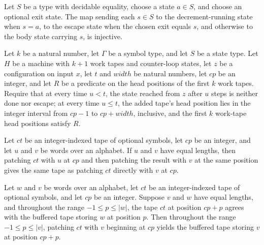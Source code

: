 \begin{lemma}
\label{Turing.counter_redirect_injective}
\leanok
{}
Let $S$ be a type with decidable equality, choose a state $a \in S$, and choose an
optional exit state. The map sending each $s \in S$ to the decrement-running state when
$s=a$, to the escape state when the chosen exit equals $s$, and otherwise to the body
state carrying $s$, is injective.
\end{lemma}

\begin{definition}
\label{Turing.counterSpan}
\leanok
{}
Let $k$ be a natural number, let $\Gamma$ be a symbol type, and let $S$ be a state type.
Let $H$ be a machine with $k+1$ work tapes and counter-loop states, let $z$ be a
configuration on input $x$, let $t$ and $width$ be natural numbers, let $cp$ be an
integer, and let $R$ be a predicate on the head positions of the first $k$ work tapes.
Require that at every time $u<t$, the state reached from $z$ after $u$ steps is neither
done nor escape; at every time $u\le t$, the added tape's head position lies in the
integer interval from $cp-1$ to $cp+width$, inclusive, and the first $k$ work-tape head
positions satisfy $R$.
\end{definition}

\begin{lemma}
\label{Turing.counter_patch_twice}
\leanok

Let $ct$ be an integer-indexed tape of optional symbols, let $cp$ be an integer, and let
$u$ and $v$ be words over an alphabet. If $u$ and $v$ have equal lengths, then patching
$ct$ with $u$ at $cp$ and then patching the result with $v$ at the same position gives
the same tape as patching $ct$ directly with $v$ at $cp$.
\end{lemma}

\begin{lemma}
\label{Turing.counter_patch_frame}
\leanok
{}
Let $w$ and $v$ be words over an alphabet, let $ct$ be an integer-indexed tape of
optional symbols, and let $cp$ be an integer. Suppose $v$ and $w$ have equal lengths,
and throughout the range $-1 \le p \le |w|$, the tape $ct$ at position $cp+p$ agrees
with the buffered tape storing $w$ at position $p$. Then throughout the range $-1 \le p
\le |v|$, patching $ct$ with $v$ beginning at $cp$ yields the buffered tape storing $v$
at position $cp+p$.
\end{lemma}

